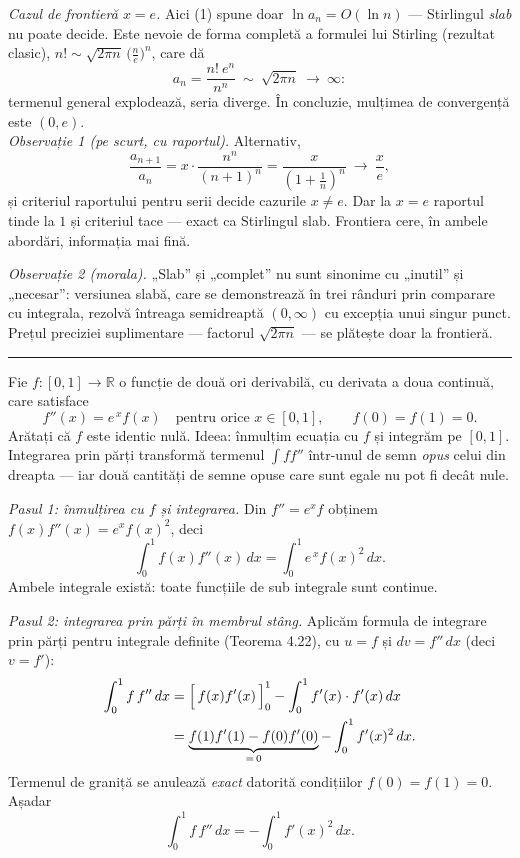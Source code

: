 \emph{Cazul de frontieră $x=e$.} Aici (1) spune doar $\ln a_{n}=O(\ln n)$ --- Stirlingul \emph{slab} nu poate decide. Este nevoie de forma completă a formulei lui Stirling (rezultat clasic), $n!\sim\sqrt{2\pi n}\,\bigl(\frac ne\bigr)^{n}$, care dă
\[ a_{n}=\frac{n!\ e^{n}}{n^{n}}\ \sim\ \sqrt{2\pi n}\ \longrightarrow\ \infty : \]
termenul general explodează, seria diverge. În concluzie, mulțimea de convergență este $(0,e)$.\\[2pt]
\emph{Observație 1 (pe scurt, cu raportul).} Alternativ,
\[ \frac{a_{n+1}}{a_{n}}=x\cdot\frac{n^{n}}{(n+1)^{n}}=\frac{x}{\left(1+\frac1n\right)^{n}}\ \longrightarrow\ \frac{x}{e} , \]
și criteriul raportului pentru serii decide cazurile $x\neq e$. Dar la $x=e$ raportul tinde la $1$ și criteriul tace --- exact ca Stirlingul slab. Frontiera cere, în ambele abordări, informația mai fină.

\emph{Observație 2 (morala).} „Slab'' și „complet'' nu sunt sinonime cu „inutil'' și „necesar'': versiunea slabă, care se demonstrează în trei rânduri prin comparare cu integrala, rezolvă întreaga semidreaptă $(0,\infty)$ cu excepția unui singur punct. Prețul preciziei suplimentare --- factorul $\sqrt{2\pi n}$ --- se plătește doar la frontieră.
\vspace{1mm}\hrule

Fie $f:[0,1]\to\mathbb{R}$ o funcție de două ori derivabilă, cu derivata a doua continuă, care satisface
\[ f''(x)=e^{\,x}f(x)\quad\text{pentru orice }x\in[0,1],\qquad f(0)=f(1)=0 . \]
Arătați că $f$ este identic nulă.
\sol Ideea: înmulțim ecuația cu $f$ și integrăm pe $[0,1]$. Integrarea prin părți transformă termenul $\int f f''$ într-unul de semn \emph{opus} celui din dreapta --- iar două cantități de semne opuse care sunt egale nu pot fi decât nule.

\emph{Pasul 1: înmulțirea cu $f$ și integrarea.} Din $f''=e^{x}f$ obținem $f(x)f''(x)=e^{x}f(x)^{2}$, deci
\[ \int_{0}^{1}f(x)f''(x)\,dx=\int_{0}^{1}e^{\,x}f(x)^{2}\,dx . \tag{1} \]
Ambele integrale există: toate funcțiile de sub integrale sunt continue.

\emph{Pasul 2: integrarea prin părți în membrul stâng.} Aplicăm formula de integrare prin părți pentru integrale definite (Teorema 4.22), cu $u=f$ și $dv=f''\,dx$ (deci $v=f'$):
\[ \begin{aligned} \int_{0}^{1}f\,f''\,dx&=\Bigl[\,f(x)f'(x)\,\Bigr]_{0}^{1}-\int_{0}^{1}f'(x)\cdot f'(x)\,dx\\ &=\underbrace{f(1)f'(1)-f(0)f'(0)}_{=\,0}-\int_{0}^{1}f'(x)^{2}\,dx . \end{aligned} \]
Termenul de graniță se anulează \emph{exact} datorită condițiilor $f(0)=f(1)=0$. Așadar
\[ \int_{0}^{1}f\,f''\,dx=-\int_{0}^{1}f'(x)^{2}\,dx . \]


